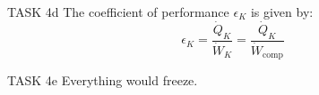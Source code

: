 TASK 4d  
The coefficient of performance \( \epsilon_K \) is given by:  
\[
\epsilon_K = \frac{\dot{Q}_K}{\dot{W}_K} = \frac{\dot{Q}_K}{\dot{W}_{\text{comp}}}
\]

TASK 4e  
Everything would freeze.